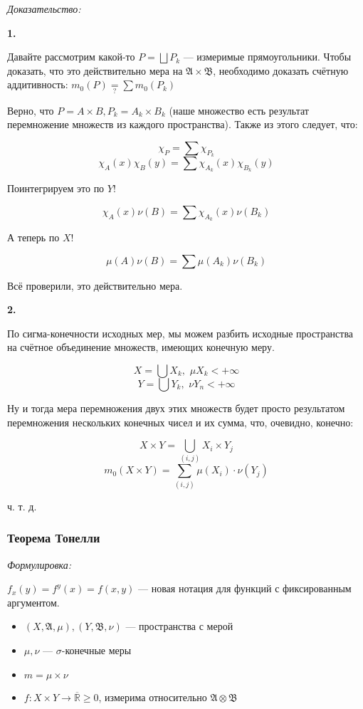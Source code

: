 \documentclass{article}
\def\dbl{\,\,}
\def\rinf{\overline{\mathbb{R}}}
\begin{document}
\textit{Доказательство:}

\textbf{1.}

Давайте рассмотрим какой-то $P = \bigsqcup P_k$ --- измеримые прямоугольники. Чтобы доказать, что это действительно мера на $\mathfrak{A} \times \mathfrak{B}$, необходимо доказать счётную аддитивность: $m_0(P) \underset{?}{=} \sum m_0(P_k)$

Верно, что $P = A \times B, P_k = A_k \times B_k$ (наше множество есть результат перемножение множеств из каждого пространства). Также из этого следует, что:

\[\chi_P = \sum \chi_{P_k}\]
\[\chi_A(x)\chi_B(y) = \sum \chi_{A_k}(x)\chi_{B_k}(y)\]

Поинтегрируем это по $Y$!

\[\chi_A(x) \nu(B) = \sum \chi_{A_k}(x)\nu(B_k)\]

А теперь по $X$!

\[\mu(A)\nu(B) = \sum \mu(A_k) \nu(B_k)\]

Всё проверили, это действительно мера.

\textbf{2.}

По сигма-конечности исходных мер, мы можем разбить исходные пространства на счётное объединение множеств, имеющих конечную меру.

\[X = \bigcup X_k, \dbl \mu X_k < +\infty\]
\[Y = \bigcup Y_k, \dbl \nu Y_n < +\infty\]

Ну и тогда мера перемножения двух этих множеств будет просто результатом перемножения нескольких конечных чисел и их сумма, что, очевидно, конечно:

\[X \times Y = \bigcup_{(i, j)} X_i \times Y_j\]
\[m_0(X \times Y) = \sum_{(i, j)} \mu(X_i) \cdot \nu(Y_j)\]

ч. т. д. 

\subsubsection{Теорема Тонелли}
\textit{Формулировка:}

$f_x(y) = f^y(x) = f(x, y)$ --- новая нотация для функций с фиксированным аргументом.

\begin{itemize}
    \item $(X, \mathfrak{A}, \mu), (Y, \mathfrak{B}, \nu)$ --- пространства с мерой
    \item $\mu, \nu$ --- $\sigma$-конечные меры
    \item $m = \mu \times \nu$
    \item $f: X \times Y \rightarrow \rinf \ge 0$, измерима относительно $\mathfrak{A} \otimes \mathfrak{B}$
\end{itemize}
\end{document}
